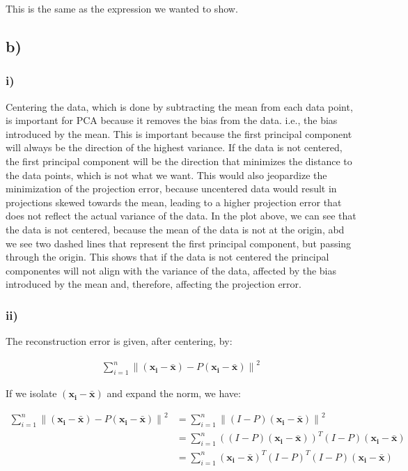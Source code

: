 \documentclass[12pt,a4paper,oneside]{paper}
\begin{document}
This is the same as the expression we wanted to show.

\newpage
\subsection*{b)}

\subsubsection*{i)}

Centering the data, which is done by subtracting the mean from each data point, is important for PCA because it
removes the bias from the data. i.e., the bias introduced by the mean.
This is important because the first principal component will always be the
direction of the highest variance. If the data is not centered, the first
principal component will be the direction that minimizes the distance to the data points,
which is not what we want. This would also jeopardize the minimization of the projection
error, because uncentered data would result in projections skewed towards the mean, 
leading to a higher projection error that does not reflect the actual variance of the data.
In the plot above, we can see that the data is not centered, because the mean of the data is not at the origin,
abd we see two dashed lines that represent the first principal component, but passing through the origin.
This shows that if the data is not centered the principal componentes will not align with the variance of the data, 
affected by the bias introduced by the mean and, therefore, affecting the projection error.

\subsubsection*{ii)}

The reconstruction error is given, after centering, by:

\begin{align*}
    \sum_{i=1}^{n} \left\| \left( \bm{x_i} - \bm{\bar{x}} \right) - P \left( \bm{x_i} - \bm{\bar{x}} \right) \right\|^2 
\end{align*}

If we isolate $\left( \bm{x_i} - \bm{\bar{x}} \right)$ and expand the norm, we have:

\begin{align*}
    \sum_{i=1}^{n} \left\| \left( \bm{x_i} - \bm{\bar{x}} \right) - P \left( \bm{x_i} - \bm{\bar{x}} \right) \right\|^2 &= \sum_{i=1}^{n} \left\| (I - P) \left( \bm{x_i} - \bm{\bar{x}} \right) \right\|^2 \\
    &= \sum_{i=1}^{n} \left( (I - P) \left( \bm{x_i} - \bm{\bar{x}} \right) \right)^T (I - P) \left( \bm{x_i} - \bm{\bar{x}} \right) \\
    &= \sum_{i=1}^{n} \left( \bm{x_i} - \bm{\bar{x}} \right)^T (I - P)^T (I - P) \left( \bm{x_i} - \bm{\bar{x}} \right) \\
\end{align*}
\end{document}
